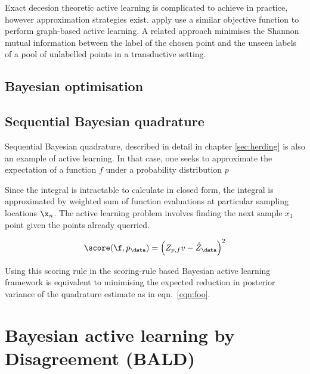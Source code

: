 Exact decesion theoretic active learning is complicated to achieve in practice, however approximation strategies exist. \citet{} apply \citet{ZhuGhahramani} use a similar objective function to perform graph-based active learning.
A related approach minimises the Shannon mutual information between the label of the chosen point and the unseen labels of a pool of unlabelled points in a transductive setting.

\subsection{Bayesian optimisation}

\subsection{Sequential Bayesian quadrature}

Sequential Bayesian quadrature, described in detail in chapter \ref{sec:herding} is also an example of active learning. In that case, one seeks to approximate the expectation of a function $f$ under a probability distribution $p$

Since the integral is intractable to calculate in closed form, the integral is approximated by weighted sum of function evaluations at particular sampling locations $\x_n$. The active learning problem involves finding the next sample $x_1$ point given the points already querried.

\begin{equation}
\score(\f,p_\data) = \left(Z_{p,f}v - \hat{Z}_\data \right)^2
\end{equation}

Using this scoring rule in the scoring-rule based Bayesian active learning framework is equivalent to minimising the expected reduction in posterior variance of the quadrature estimate as in eqn.\ \eqref{eqn:foo}.

\section{Bayesian active learning by Disagreement (BALD)}
